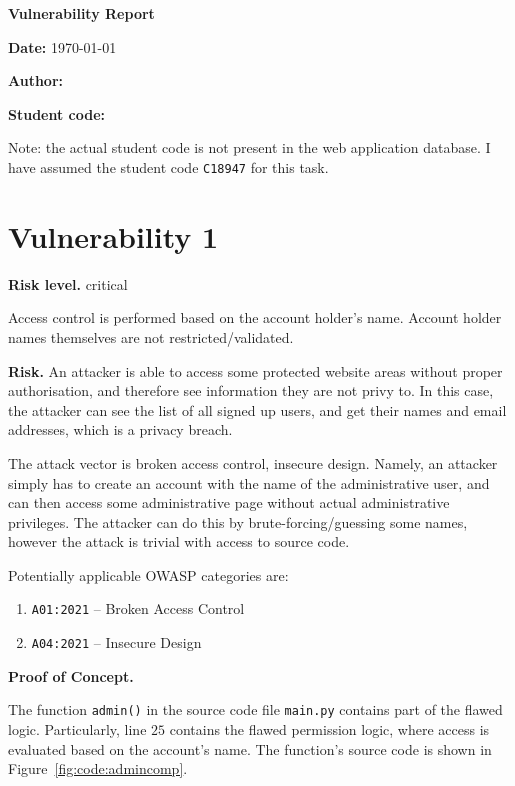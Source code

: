 \documentclass[parskip=half]{scrartcl}
\newcommand{\figref}[1]{Figure~\ref{#1}}
\begin{document}
{\LARGE \textbf{\textsf{Vulnerability Report}}}
\vspace*{1em}

\textbf{Date:} \today

\textbf{Author:} \docauthor

\textbf{Student code:} \texttt{\studentcode}

Note: the actual student code is not present in the web application database.
I have assumed the student code \texttt{C18947} for this task.

\section*{Vulnerability 1}\label{vuln1}

\textbf{Risk level.} critical

Access control is performed based on the account holder's name. Account holder
names themselves are not restricted/validated.

\textbf{Risk.} An attacker is able to access some protected website areas
without proper authorisation, and therefore see information they are not privy
to. In this case, the attacker can see the list of all signed up users, and
get their names and email addresses, which is a privacy breach.

The attack vector is broken access control, insecure design. Namely, an
attacker simply has to create an account with the name of the administrative
user, and can then access some administrative page without actual
administrative privileges. The attacker can do this by brute-forcing/guessing
some names, however the attack is trivial with access to source code.

Potentially applicable OWASP categories are:
\begin{enumerate}
  \item \texttt{A01:2021} -- Broken Access Control%
  \item \texttt{A04:2021} -- Insecure Design%
\end{enumerate}

\textbf{Proof of Concept.}

The function \texttt{admin()} in the source code file \texttt{main.py} contains
part of the flawed logic. Particularly, line $25$ contains the flawed
permission logic, where access is evaluated based on the account's name.
The function's source code is shown in \figref{fig:code:admincomp}.
\end{document}
